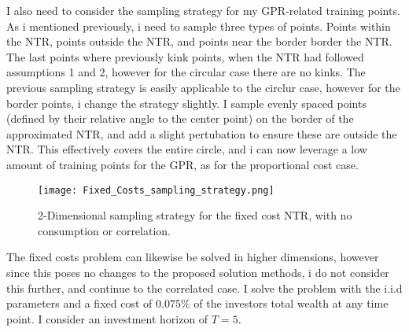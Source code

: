 \documentclass[11pt]{article}
\begin{document}
I also need to consider the sampling strategy for my \ac{GPR}-related training points. As i mentioned previously, i need to sample three types of points.
Points within the \ac{NTR}, points outside the \ac{NTR}, and points near the border border the \ac{NTR}. The last points where previously kink points,
when the NTR had followed assumptions 1 and 2, however for the circular case there are no kinks.
The previous sampling strategy is easily applicable to the circlur case, however for the border points, i change the strategy slightly.
I sample evenly spaced points (defined by their relative angle to the center point) on the border of the approximated \ac{NTR}, and add a slight pertubation to ensure these are outside the NTR.
This effectively covers the entire circle, and i can now leverage a low amount of training points for the GPR, as for the proportional cost case.
\begin{figure}[!ht]
    \centering
    \texttt{[image: Fixed\_Costs\_sampling\_strategy.png]}
    \caption{2-Dimensional sampling strategy for the fixed cost NTR, with no consumption or correlation.}
    \label{fig:Sample_Strategy_Fixed}
\end{figure}
The fixed costs problem can likewise be solved in higher dimensions, however since this poses no changes to the proposed solution methods,
i do not consider this further, and continue to the correlated case.
I solve the problem with the i.i.d parameters and a fixed cost of $0.075\%$ of the investors total wealth at any time point. I consider an investment horizon of $T = 5$.
\end{document}
